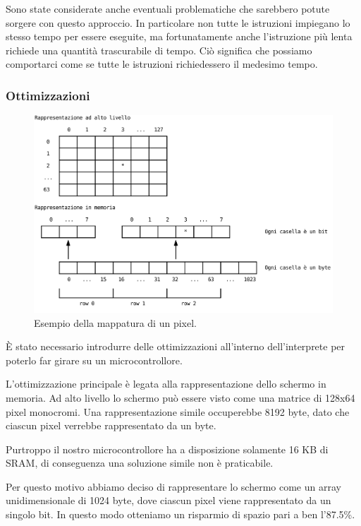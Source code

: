 \documentclass[a4paper]{article}
\begin{document}
Sono state considerate anche eventuali problematiche che sarebbero
potute sorgere con questo approccio. In particolare non tutte le
istruzioni impiegano lo stesso tempo per essere eseguite, ma
fortunatamente anche l'istruzione più lenta richiede una quantità
trascurabile di tempo. Ciò significa che possiamo
comportarci come se tutte le istruzioni richiedessero il medesimo
tempo.

\subsubsection{Ottimizzazioni}

\begin{figure}
    \begin{center}
        \includegraphics[scale=0.50]{figures/screenopt.pdf}
    \end{center}
    \caption{Esempio della mappatura di un pixel.}
    \label{fig:screenopt}
\end{figure}

È stato necessario introdurre delle ottimizzazioni all'interno
dell'interprete per poterlo far girare su un microcontrollore.

L'ottimizzazione principale è legata alla rappresentazione dello
schermo in memoria. Ad alto livello lo schermo può essere visto
come una matrice di 128x64 pixel monocromi. Una rappresentazione
simile occuperebbe 8192 byte, dato che ciascun pixel verrebbe
rappresentato da un byte.

Purtroppo il nostro microcontrollore ha a disposizione solamente
16 KB di SRAM, di conseguenza una soluzione simile non è praticabile.

Per questo motivo abbiamo deciso di rappresentare lo schermo come
un array unidimensionale di 1024 byte, dove ciascun pixel viene
rappresentato da un singolo bit. In questo modo otteniamo un
risparmio di spazio pari a ben l'87.5\%.
\end{document}
